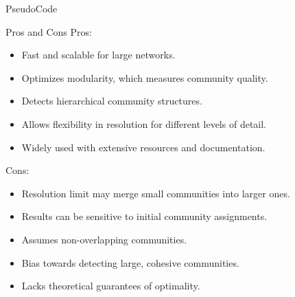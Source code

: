 \begin{frame}[fragile]{PseudoCode}
\end{frame}

\begin{frame}[fragile]{Pros and Cons}
Pros:
\begin{itemize}
    \item Fast and scalable for large networks.
    \item Optimizes modularity, which measures community quality.
    \item Detects hierarchical community structures.
    \item Allows flexibility in resolution for different levels of detail.
    \item Widely used with extensive resources and documentation.
\end{itemize}

Cons:
\begin{itemize}
    \item Resolution limit may merge small communities into larger ones.
    \item Results can be sensitive to initial community assignments.
    \item Assumes non-overlapping communities.
    \item Bias towards detecting large, cohesive communities.
    \item Lacks theoretical guarantees of optimality.
\end{itemize}
\end{frame}

